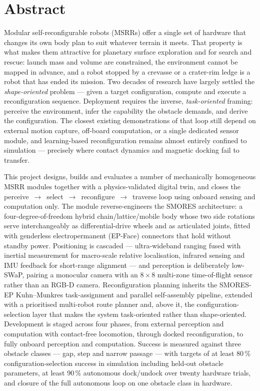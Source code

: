 \documentclass[11pt,a4paper]{article}
\newif\ifreview
\newcommand{\pending}[1]{\ifreview{\color{blue}#1}\else#1\fi}
\begin{document}
\section*{\pending{Abstract}}

Modular self-reconfigurable robots (MSRRs) offer a single set of hardware that
changes its own body plan to suit whatever terrain it meets. That property is
what makes them attractive for planetary surface exploration and for search and
rescue: launch mass and volume are constrained, the environment cannot be
mapped in advance, and a robot stopped by a crevasse or a crater-rim ledge is a
robot that has ended its mission. Two decades of research have largely settled
the \emph{shape-oriented} problem --- given a target configuration, compute and
execute a reconfiguration sequence. Deployment requires the inverse,
\emph{task-oriented} framing: perceive the environment, infer the capability
the obstacle demands, and derive the configuration. The closest existing
demonstrations of that loop still depend on external motion capture, off-board
computation, or a single dedicated sensor module, and learning-based
reconfiguration remains almost entirely confined to simulation --- precisely
where contact dynamics and magnetic docking fail to transfer.

This project designs, builds and evaluates a number of mechanically homogeneous
MSRR modules together with a physics-validated digital twin, and closes the
perceive~$\rightarrow$~select~$\rightarrow$~reconfigure~$\rightarrow$~traverse
loop using onboard sensing and computation only. The module reverse-engineers
the SMORES architecture: a four-degree-of-freedom hybrid chain/lattice/mobile
body whose two side rotations serve interchangeably as differential-drive
wheels and as articulated joints, fitted with genderless electropermanent
(EP-Face) connectors that hold without standby power. Positioning is
cascaded --- ultra-wideband ranging fused with inertial measurement for
macro-scale relative localisation, infrared sensing and IMU feedback for
short-range alignment --- and perception is deliberately low-SWaP, pairing a
monocular camera with an $8\times8$ multi-zone time-of-flight sensor rather
than an RGB-D camera. Reconfiguration planning inherits the SMORES-EP
Kuhn--Munkres task-assignment and parallel self-assembly pipeline, extended
with a prioritised multi-robot route planner and, above it, the
configuration-selection layer that makes the system task-oriented rather than
shape-oriented. Development is staged across four phases, from external
perception and computation with contact-free locomotion, through docked
reconfiguration, to fully onboard perception and computation. Success is
measured against three obstacle classes --- gap, step and narrow passage ---
with targets of at least 80\,\% configuration-selection success in simulation
including held-out obstacle parameters, at least 90\,\% autonomous dock/undock
over twenty hardware trials, and closure of the full autonomous loop on one
obstacle class in hardware.
\end{document}
